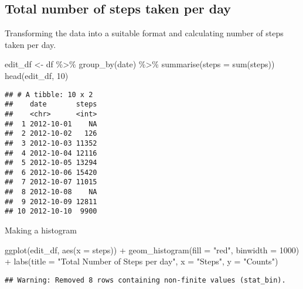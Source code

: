 \documentclass[
]{article}
\newenvironment{Shaded}{\begin{snugshade}}{\end{snugshade}}
\newcommand{\AttributeTok}[1]{\textcolor[rgb]{0.77,0.63,0.00}{#1}}
\newcommand{\DecValTok}[1]{\textcolor[rgb]{0.00,0.00,0.81}{#1}}
\newcommand{\FunctionTok}[1]{\textcolor[rgb]{0.00,0.00,0.00}{#1}}
\newcommand{\NormalTok}[1]{#1}
\newcommand{\OtherTok}[1]{\textcolor[rgb]{0.56,0.35,0.01}{#1}}
\newcommand{\SpecialCharTok}[1]{\textcolor[rgb]{0.00,0.00,0.00}{#1}}
\newcommand{\StringTok}[1]{\textcolor[rgb]{0.31,0.60,0.02}{#1}}
\begin{document}
\hypertarget{total-number-of-steps-taken-per-day}{%
\subsection{Total number of steps taken per
day}\label{total-number-of-steps-taken-per-day}}

Transforming the data into a suitable format and calculating number of
steps taken per day.

\begin{Shaded}
\begin{Highlighting}[]
\NormalTok{edit\_df }\OtherTok{\textless{}{-}}\NormalTok{ df }\SpecialCharTok{\%\textgreater{}\%} \FunctionTok{group\_by}\NormalTok{(date) }\SpecialCharTok{\%\textgreater{}\%} \FunctionTok{summarise}\NormalTok{(}\AttributeTok{steps =} \FunctionTok{sum}\NormalTok{(steps))}
\FunctionTok{head}\NormalTok{(edit\_df, }\DecValTok{10}\NormalTok{)}
\end{Highlighting}
\end{Shaded}

\begin{verbatim}
## # A tibble: 10 x 2
##    date       steps
##    <chr>      <int>
##  1 2012-10-01    NA
##  2 2012-10-02   126
##  3 2012-10-03 11352
##  4 2012-10-04 12116
##  5 2012-10-05 13294
##  6 2012-10-06 15420
##  7 2012-10-07 11015
##  8 2012-10-08    NA
##  9 2012-10-09 12811
## 10 2012-10-10  9900
\end{verbatim}

Making a histogram

\begin{Shaded}
\begin{Highlighting}[]
\FunctionTok{ggplot}\NormalTok{(edit\_df, }\FunctionTok{aes}\NormalTok{(}\AttributeTok{x =}\NormalTok{ steps)) }\SpecialCharTok{+} 
  \FunctionTok{geom\_histogram}\NormalTok{(}\AttributeTok{fill =} \StringTok{"red"}\NormalTok{, }\AttributeTok{binwidth =} \DecValTok{1000}\NormalTok{) }\SpecialCharTok{+} 
  \FunctionTok{labs}\NormalTok{(}\AttributeTok{title =} \StringTok{"Total Number of Steps per day"}\NormalTok{, }\AttributeTok{x =} \StringTok{"Steps"}\NormalTok{, }\AttributeTok{y =} \StringTok{"Counts"}\NormalTok{)}
\end{Highlighting}
\end{Shaded}

\begin{verbatim}
## Warning: Removed 8 rows containing non-finite values (stat_bin).
\end{verbatim}
\end{document}
